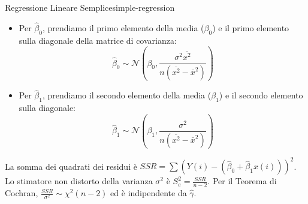 \begin{esempio}{Regressione Lineare Semplice}{simple-regression}
\begin{itemize}
    \item Per $\hat{\beta}_0$, prendiamo il primo elemento della media ($\beta_0$) e il primo elemento sulla diagonale della matrice di covarianza:
    \[
    \hat{\beta}_0 \sim \mathcal{N}\left(\beta_0, \frac{\sigma^2\overline{x^2}}{n(\overline{x^2}-\bar{x}^2)}\right)
    \]
    \item Per $\hat{\beta}_1$, prendiamo il secondo elemento della media ($\beta_1$) e il secondo elemento sulla diagonale:
    \[
    \hat{\beta}_1 \sim \mathcal{N}\left(\beta_1, \frac{\sigma^2}{n(\overline{x^2}-\bar{x}^2)}\right)
    \]
\end{itemize}
La somma dei quadrati dei residui è $SSR = \sum(Y(i) - (\hat{\beta}_0 +
\hat{\beta}_1 x(i)))^2$. Lo stimatore non distorto della varianza $\sigma^2$ è
$S_e^2 = \frac{SSR}{n-2}$\label{eq:se-lin-regr}. Per il Teorema di Cochran, $\frac{SSR}{\sigma^2} \sim
\chi^2(n-2)$ ed è indipendente da $\hat{\gamma}$.
\end{esempio}
